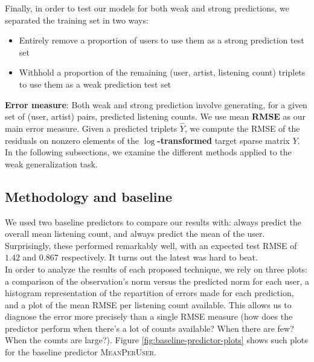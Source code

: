 \documentclass[10pt,a4paper]{article}
\begin{document}
  Finally, in order to test our models for both weak and strong predictions, we separated the training set in two ways:
  \begin{itemize}
    \item Entirely remove a proportion of users to use them as a strong prediction test set
    \item Withhold a proportion of the remaining (user, artist, listening count) triplets to use them as a weak prediction test set
  \end{itemize}

  \textbf{Error measure}: Both weak and strong prediction involve generating, for a given set of (user, artist) pairs, predicted listening counts. We use mean \textbf{RMSE} as our main error measure. Given a predicted triplets $\hat{Y}$, we compute the RMSE of the residuals on nonzero elements of the \textbf{$\log$-transformed} target sparse matrix $Y$.\\

  In the following subsections, we examine the different methods applied to the weak generalization task.

  \subsection{Methodology and baseline}
  We used two baseline predictors to compare our results with: always predict the overall mean listening count, and always predict the mean of the user. Surprisingly, these performed remarkably well, with an expected test RMSE of $1.42$ and $0.867$ respectively. It turns out the latest was hard to beat.\\
  In order to analyze the results of each proposed technique, we rely on three plots: a comparison of the observation's norm versus the predicted norm for each user, a histogram representation of the repartition of errors made for each prediction, and a plot of the mean RMSE per listening count available. This allows us to diagnose the error more precisely than a single RMSE measure (how does the predictor perform when there's a lot of counts available? When there are few? When the counts are large?). Figure \ref{fig:baseline-predictor-plots} shows such plots for the baseline predictor \textsc{MeanPerUser}.
\end{document}
